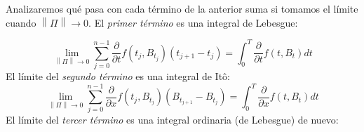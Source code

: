 \documentclass[11pt,notitlepage]{article}
\begin{document}
Analizaremos qué pasa con cada término de la anterior suma si tomamos el límite cuando $\left \| \Pi \right \| \rightarrow 0$. El \textit{primer término} es una integral de Lebesgue:

\begin{equation}\label{sec2.3_término1}
    \lim_{\left \| \Pi \right \| \rightarrow 0} \sum_{j=0}^{n-1}\frac{\partial}{\partial t}f(t_{j},B_{t_{j}})(t_{j+1}-t_{j})=\int_{0}^{T}\frac{\partial}{\partial t}f(t,B_{t})dt
\end{equation}
El límite del \textit{segundo término} es una integral de Itô:
\begin{equation}\label{sec2.3_término2}
    \lim_{\left \| \Pi \right \| \rightarrow 0}\sum_{j=0}^{n-1}\frac{\partial}{\partial x}f(t_{j},B_{t_{j}})(B_{t_{j+1}}-B_{t_{j}})=\int_{0}^{T}\frac{\partial}{\partial x}f(t,B_{t})dt
\end{equation}
El límite del \textit{tercer término} es una integral ordinaria (de Lebesgue) de nuevo:
\end{document}
